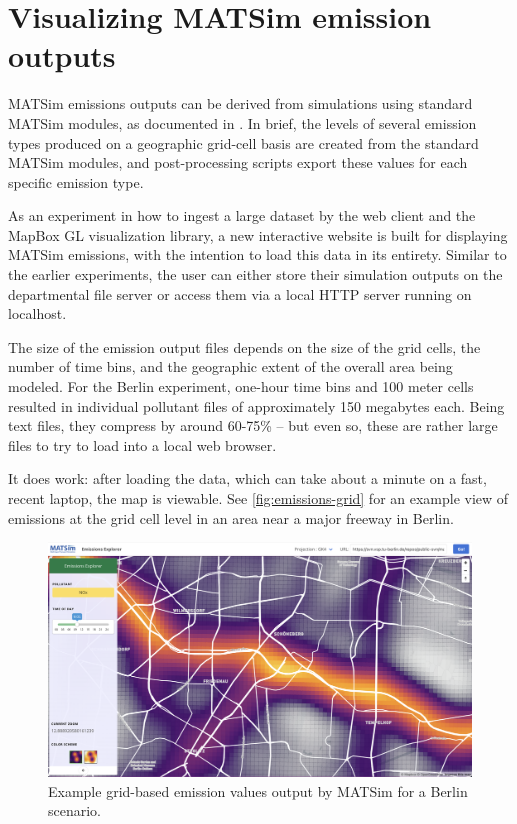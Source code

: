 \hypertarget{server-experiments-emissions}{%
\section{Visualizing MATSim emission outputs}
\label{server-experiments-emissions}}

MATSim emissions outputs can be derived from simulations using standard MATSim modules, as documented in \cite{Kickhoefer2015EmissionModeling}. In brief, the levels of several emission types produced on a geographic grid-cell basis are created from the standard MATSim modules, and post-processing scripts export these values for each specific emission type.

As an experiment in how to ingest a large dataset by the web client and the MapBox GL visualization library, a new interactive website is built for displaying MATSim emissions, with the intention to load this data in its entirety. Similar to the earlier experiments, the user can either store their simulation outputs on the departmental file server or access them via a local HTTP server running on localhost.

The size of the emission output files depends on the size of the grid cells, the number of time bins, and the geographic extent of the overall area being modeled. For the Berlin experiment, one-hour time bins and 100 meter cells resulted in individual pollutant files of approximately 150 megabytes each. Being text files, they compress by around 60-75\% -- but even so, these are rather large files to try to load into a local web browser.

It does work: after loading the data, which can take about a minute on a fast, recent laptop, the map is viewable. See \autoref{fig:emissions-grid} for an example view of emissions at the grid cell level in an area near a major freeway in Berlin.

\begin{figure}[!ht]
  \includegraphics[width=\textwidth]{chapters/12-server-experiments/images/emissions-grid.png}
  \caption{Example grid-based emission values output by MATSim for a Berlin scenario.}
  \label{fig:emissions-grid}
\end{figure}


